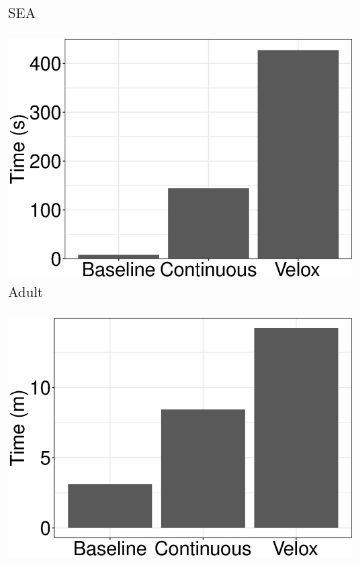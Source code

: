 \documentclass[10pt,conference,letterpaper]{IEEEtran}
\begin{document}
\begin{figure}[h]
\begin{subfigure}[b]{0.2\textwidth}
	\caption{SEA}
	\label{fig:sea-times}
\end{subfigure}%
\begin{subfigure}[b]{0.2\textwidth}
	\includegraphics[width=\linewidth, height=\linewidth,keepaspectratio]{../images/experiment-results/adult-times.eps}
	\caption{Adult}
	\label{fig:adult-times}
\end{subfigure}%
\begin{subfigure}[b]{0.2\textwidth}
	\includegraphics[width=\linewidth, height=\linewidth,keepaspectratio]{../images/experiment-results/movie-lens-100k-times.eps}

\end{subfigure}
\end{figure}
\end{document}
